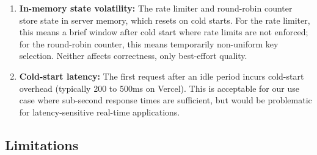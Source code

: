 \documentclass[11pt,a4paper]{article}
\theoremstyle{plain}
\theoremstyle{definition}
\theoremstyle{remark}
\begin{document}
\begin{enumerate}[noitemsep,topsep=4pt]
    \item \textbf{In-memory state volatility:} The rate limiter and round-robin counter store state in server memory, which resets on cold starts. For the rate limiter, this means a brief window after cold start where rate limits are not enforced; for the round-robin counter, this means temporarily non-uniform key selection. Neither affects correctness, only best-effort quality.

    \item \textbf{Cold-start latency:} The first request after an idle period incurs cold-start overhead (typically 200 to 500ms on Vercel). This is acceptable for our use case where sub-second response times are sufficient, but would be problematic for latency-sensitive real-time applications.
\end{enumerate}

\subsection{Limitations}
\end{document}

